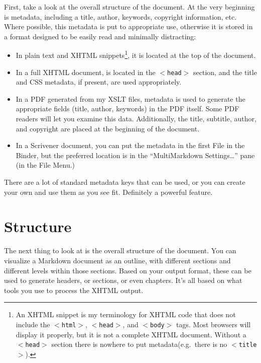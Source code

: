 \documentclass[oneside,article]{memoir}
\begin{document}
First, take a look at the overall structure of the document. At the very
beginning is metadata, including a title, author, keywords, copyright
information, etc. Where possible, this metadata is put to appropriate use,
otherwise it is stored in a format designed to be easily read and minimally
distracting:


\begin{itemize}


\item In plain text and XHTML snippets\footnote{An XHTML snippet is my terminology for XHTML code that does not
include the \texttt{$<$html$>$}, \texttt{$<$head$>$}, and \texttt{$<$body$>$} tags. Most browsers will display
it properly, but it is not a complete XHTML document. Without a \texttt{$<$head$>$}
section there is nowhere to put metadata(e.g.\ there is no \texttt{$<$title$>$}).}, it is located at the top of the
document.




\item In a full XHTML document, is located in the \texttt{$<$head$>$} section, and the title
and CSS metadata, if present, are used appropriately.




\item In a PDF generated from my XSLT files, metadata is used to generate the
appropriate fields (title, author, keywords) in the PDF itself. Some PDF
readers will let you examine this data. Additionally, the title, subtitle,
author, and copyright are placed at the beginning of the document.




\item In a Scrivener document, you can put the metadata in the first File in the
Binder, but the preferred location is in the ``MultiMarkdown Settings{\ldots}''
pane (in the File Menu.)



\end{itemize}

There are a lot of standard metadata keys that can be used, or you can create
your own and use them as you see fit. Definitely a powerful feature.


\section{Structure}
\label{structure}

The next thing to look at is the overall structure of the document. You can
visualize a Markdown document as an outline, with different sections and
different levels within those sections. Based on your output format, these can
be used to generate headers, or sections, or even chapters. It's all based on
what tools you use to process the XHTML output.
\end{document}
